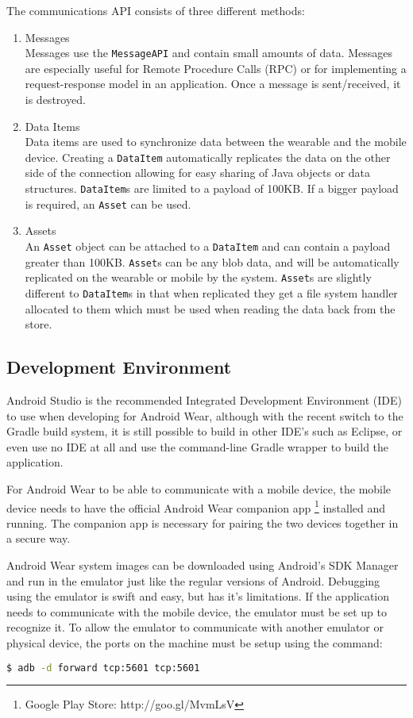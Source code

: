 The communications API consists of three different methods:
\begin{enumerate}

\item Messages\\
Messages use the \texttt{MessageAPI} and contain small amounts of data. Messages
are especially useful for Remote Procedure Calls (RPC) or for implementing a
request-response model in an application. Once a message is sent/received, it
is destroyed.
\item Data Items\\
Data items are used to synchronize data between the wearable and the mobile
device. Creating a \texttt{DataItem} automatically replicates the data on the
other side of the connection allowing for easy sharing of Java objects or data
structures. \texttt{DataItem}s are limited to a payload of 100KB. If a bigger
payload is required, an \texttt{Asset} can be used.
\item Assets\\
An \texttt{Asset} object can be attached to a \texttt{DataItem} and can contain
a payload greater than 100KB. \texttt{Asset}s can be any blob data, and will be
automatically replicated on the wearable or mobile by the system.
\texttt{Asset}s are slightly different to \texttt{DataItem}s in that when
replicated they get a file system handler allocated to them which must be used
when reading the data back from the store.

\end{enumerate}

\subsection{Development Environment}
Android Studio is the recommended Integrated Development Environment (IDE) to
use when developing for Android Wear, although with the recent switch to the
Gradle build system, it is still possible to build in other IDE's such as
Eclipse, or even use no IDE at all and use the command-line Gradle wrapper to
build the application.

For Android Wear to be able to communicate with a mobile device, the mobile
device needs to have the official Android Wear companion app
\footnote{Google Play Store: http://goo.gl/MvmLsV}
installed and running. The companion app is necessary for pairing the two
devices together in a secure way.

Android Wear system images can be downloaded using Android's SDK Manager and run
in the emulator just like the regular versions of Android. Debugging using the
emulator is swift and easy, but has it's limitations. If the application needs
to communicate with the mobile device, the emulator must be set up to recognize
it. To allow the emulator to communicate with another emulator or physical
device, the ports on the machine must be setup using the command:
\begin{lstlisting}[language=Bash]
$ adb -d forward tcp:5601 tcp:5601
\end{lstlisting}

